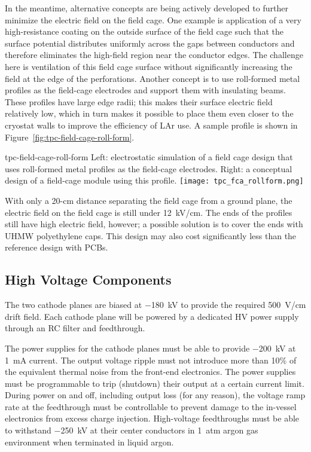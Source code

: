 In the meantime, alternative concepts are being actively developed to
further minimize the electric field on the field cage.  One example is
application of a very high-resistance coating on the outside surface
of the field cage such that the surface potential distributes
uniformly across the gaps between conductors and therefore eliminates
the high-field region near the conductor edges.  The challenge here is
ventilation of this field cage surface without significantly
increasing the field at the edge of the perforations.  Another concept
is to use roll-formed metal profiles as the field-cage electrodes and
support them with insulating beams.  These profiles have large edge
radii; this makes their surface electric field relatively low, which
in turn makes it possible to place them even closer to the cryostat
walls to improve the efficiency of LAr use.  A sample profile is shown
in Figure~\ref{fig:tpc-field-cage-roll-form}.
\begin{cdrfigure}{tpc-field-cage-roll-form}
{Left: electrostatic simulation of a field cage design that uses roll-formed 
metal profiles as the field-cage electrodes.  Right: a conceptual design of a 
field-cage module using this profile.}
\texttt{[image: tpc\_fca\_rollform.png]}
\end{cdrfigure}
With only a 20-cm distance separating the field cage from a ground
plane, the electric field on the field cage is still under 12~kV/cm.
The ends of the profiles still have high electric field, however; a
possible solution is to cover the ends with UHMW polyethylene caps.
This design may also cost significantly less than the reference design
with PCBs.


\subsection{High Voltage Components}  
\label{subsec:fd-ref-hv}
   
The two cathode planes are biased at $-$180~kV to provide the required
500~V/cm drift field. Each cathode plane will be powered by a
dedicated HV power supply through an RC filter and feedthrough.

The power supplies for the cathode planes must be able to provide
$-$200~kV at 1~mA current. The output voltage ripple must not
introduce more than 10\% of the equivalent thermal noise from the
front-end electronics.  The power supplies must be programmable to
trip (shutdown) their output at a certain current limit.  During power
on and off, including output loss (for any reason), the voltage ramp
rate at the feedthrough must be controllable to prevent damage to the
in-vessel electronics from excess charge injection.  High-voltage
feedthroughs must be able to withstand $-$250~kV at their center
conductors in 1~atm argon gas environment when terminated in liquid
argon.


